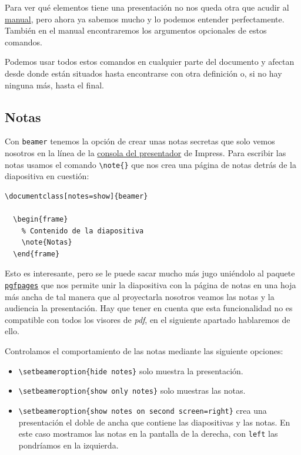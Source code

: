Para ver qué elementos tiene una presentación no nos queda otra que
acudir al
\href{http://osl.ugr.es/CTAN/macros/latex/contrib/beamer/doc/beameruserguide.pdf}{manual},
pero ahora ya sabemos mucho y lo podemos entender perfectamente. También
en el manual encontraremos los argumentos opcionales de estos comandos.

Podemos usar todos estos comandos en cualquier parte del documento y
afectan desde donde están situados hasta encontrarse con otra definición
o, si no hay ninguna más, hasta el final.

\subsection{Notas}

Con \lstinline!beamer! tenemos la opción de crear unas notas secretas
que solo vemos nosotros en la línea de la
\href{https://wiki.openoffice.org/wiki/Presenter_Screen}{consola del
presentador} de Impress. Para escribir las notas usamos el comando
\lstinline!\note{}! que nos crea una página de notas detrás de la
diapositiva en cuestión:

\begin{lstlisting}[language={[latex]tex}]
\documentclass[notes=show]{beamer}

  \begin{frame}
    % Contenido de la diapositiva
    \note{Notas}
  \end{frame}

\end{lstlisting}

Esto es interesante, pero se le puede sacar mucho más jugo uniéndolo al
paquete \href{http://ctan.org/pkg/pgf}{\lstinline!pgfpages!} que nos
permite unir la diapositiva con la página de notas en una hoja más ancha
de tal manera que al proyectarla nosotros veamos las notas y la
audiencia la presentación. Hay que tener en cuenta que esta
funcionalidad no es compatible con todos los visores de \emph{pdf}, en
el siguiente apartado hablaremos de ello.

Controlamos el comportamiento de las notas mediante las siguiente
opciones:

\begin{itemize}
\item
  \lstinline!\setbeameroption{hide notes}! solo muestra la presentación.
\item
  \lstinline!\setbeameroption{show only notes}! solo muestras las notas.
\item
  \lstinline!\setbeameroption{show notes on second screen=right}! crea
  una presentación el doble de ancha que contiene las diapositivas y las
  notas. En este caso mostramos las notas en la pantalla de la derecha,
  con \lstinline!left! las pondríamos en la izquierda.
\end{itemize}

